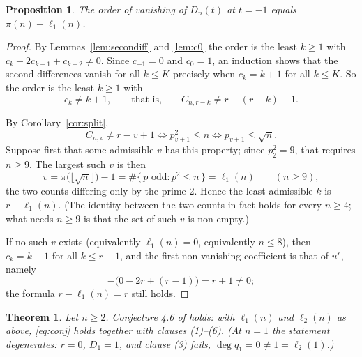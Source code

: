 \documentclass[a4paper,11pt,oneside,reqno]{amsart}
\theoremstyle{definition}
\theoremstyle{remark}
\theoremstyle{plain}
\newtheorem{theorem}[definition]{Theorem}
\newtheorem{proposition}[definition]{Proposition}
\begin{document}
\begin{proposition}\label{prop:order}
  The order of vanishing of \(D_n(t)\) at \(t = -1\) equals \(\pi(n)-\ell_1(n)\).
\end{proposition}

\begin{proof}
  By Lemmas~\ref{lem:secondiff} and \ref{lem:c0} the order is the least
  \(k \ge 1\) with \(c_k-2c_{k-1}+c_{k-2} \ne 0\). Since \(c_{-1} = 0\) and
  \(c_0 = 1\), an induction shows that the second differences vanish for all
  \(k \le K\) precisely when \(c_k = k+1\) for all \(k \le K\). So the order is the
  least \(k \ge 1\) with
  \[
    c_k \ne k+1,\qquad\text{that is,}\qquad C_{n,r-k} \ne r-(r-k)+1 .
  \]

  By Corollary~\ref{cor:split},
  \[
    C_{n,v} \ne r-v+1
    \iff p_{v+1}^{2} \le n
    \iff p_{v+1} \le \sqrt n .
  \]
  Suppose first that some admissible \(v\) has this property; since
  \(p_2^{2} = 9\), that requires \(n \ge 9\). The largest such \(v\) is then
  \[
    v = \pi\bigl(\lfloor\sqrt n\rfloor\bigr)-1
     =\#\{\,p\text{ odd} : p^{2} \le n\,\} = \ell_1(n)
     \qquad(n \ge 9),
  \]
  the two counts differing only by the prime \(2\). Hence the least admissible
  \(k\) is \(r-\ell_1(n)\). (The identity between the two counts in fact holds
  for every \(n \ge 4\); what needs \(n \ge 9\) is that the set of such \(v\) is
  non-empty.)

  If no such \(v\) exists (equivalently \(\ell_1(n) = 0\), equivalently
  \(n \le 8\)), then \(c_k = k+1\) for all
  \(k \le r-1\), and the first non-vanishing coefficient is that of \(u^{r}\),
  namely
  \[
    -\bigl(0-2r+(r-1)\bigr) = r+1 \ne 0;
  \]
  the formula \(r-\ell_1(n) = r\) still holds.
\end{proof}

\begin{theorem}\label{thm:conj}
  Let \(n \ge 2\). Conjecture 4.6 of \cite{Snellman2000} holds: with
  \(\ell_1(n)\) and \(\ell_2(n)\) as above, \eqref{eq:conj} holds together with
  clauses (1)--(6). (At \(n = 1\) the statement degenerates: \(r = 0\), \(D_1 = 1\),
  and clause (3) fails, \(\deg q_1 = 0 \ne 1 = \ell_2(1)\).)
\end{theorem}
\end{document}
